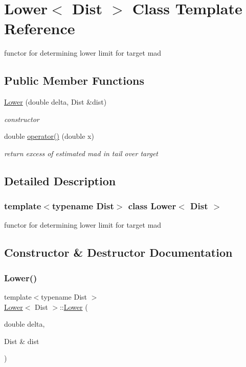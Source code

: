 \hypertarget{classLower}{}\section{Lower$<$ Dist $>$ Class Template Reference}
\label{classLower}


functor for determining lower limit for target mad  


\subsection*{Public Member Functions}
\begin{DoxyCompactItemize}
\item 
\mbox{\hyperlink{classLower_a7b15b81ad8c6819daf8250db2ef48d00}{Lower}} (double delta, Dist \&dist)
\begin{DoxyCompactList}\small\item\em constructor \end{DoxyCompactList}\item 
double \mbox{\hyperlink{classLower_a8bccbc4121152cb8dc259c1eab4128f5}{operator()}} (double x)
\begin{DoxyCompactList}\small\item\em return excess of estimated mad in tail over target \end{DoxyCompactList}\end{DoxyCompactItemize}


\subsection{Detailed Description}
\subsubsection*{template$<$typename Dist$>$\newline
class Lower$<$ Dist $>$}

functor for determining lower limit for target mad 

\subsection{Constructor \& Destructor Documentation}
\mbox{\label{classLower_a7b15b81ad8c6819daf8250db2ef48d00}} 
\subsubsection{\texorpdfstring{Lower()}{Lower()}}
{\footnotesize\ttfamily template$<$typename Dist $>$ \\
\mbox{\hyperlink{classLower}{Lower}}$<$ Dist $>$\+::\mbox{\hyperlink{classLower}{Lower}} (\begin{DoxyParamCaption}\item[{double}]{delta,  }\item[{Dist \&}]{dist }\end{DoxyParamCaption})\hspace{0.3cm}{\ttfamily [inline]}}



